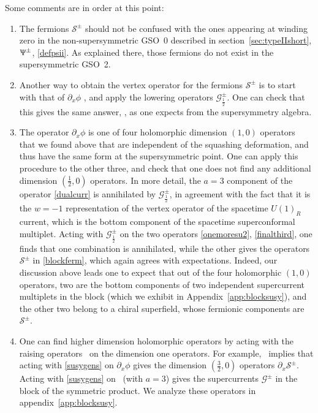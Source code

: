 \documentclass[12pt]{article}
\def\PsiST{\Uppsi}
\def\half{\frac12}
\def\coeff#1#2{{\textstyle \frac{#1}{#2}}}
\def\hf{\coeff12}
\numberwithin{equation}{section}
\def\cG{\mathcal {G}} \def\cH{\mathcal {H}} \def\cI{\mathcal {I}}
\def\cS{\mathcal {S}} \def\cT{\mathcal {T}} \def\cU{\mathcal {U}}
\def\coeff#1#2{{\textstyle{\frac{#1}{ #2}}}}
\def\half{\frac12}
\def\hf{{\textstyle\half}}
\begin{document}
Some comments are in order at this point:
\begin{enumerate}[1)]
\item The fermions $\cS^\pm$ should not be confused with the ones appearing at winding zero in the non-supersymmetric GSO~0 described in section~\ref{sec:typeIIshort}, $\PsiST^\pm$, \eqref{defpsii}. As explained there, those fermions do not exist in the supersymmetric GSO~2. 
\item Another way to obtain the vertex operator for the fermions $\cS^\pm$ is to start with that of $\partial_x\phi$ \dualbbzero, and apply the lowering operators $\cG^\pm_{\frac{1}{2}}$. One can check that this gives the same answer, \blockferm, as one expects from the supersymmetry algebra.
\item The operator $\partial_x\phi$ is one of four holomorphic dimension $(1,0)$ operators that we found above that are independent of the squashing deformation, and thus have the same form at the supersymmetric point. One can apply this procedure to the other three, and check that one does not find any additional dimension $(\hf,0)$ operators. In more detail, the $a=3$ component of the operator \eqref{dualcurr} is annihilated by $\cG^\pm_{\frac{1}{2}}$, in agreement with the fact that it is the $w=-1$ representation of the vertex operator of the spacetime $U(1)_R$ current, which is the bottom component of the spacetime superconformal multiplet. Acting with $\cG^\pm_{\frac{1}{2}}$ on the two operators \eqref{onemoresu2}, \eqref{finalthird}, one finds that one combination is annihilated, while the other gives the operators $\cS^\pm$ in \eqref{blockferm}, which again agrees with expectations. Indeed, our discussion above leads one to expect that out of the four holomorphic $(1,0)$ operators, two are the bottom components of two independent supercurrent multiplets in the block (which we exhibit in Appendix~\ref{app:blocksusy}), and the other two belong to a chiral superfield, whose fermionic components are $\cS^\pm$. 
%
\item One can find higher dimension holomorphic operators by acting with the raising operators \susygens\ on the dimension one operators. For example, \sppmm\ implies that acting with \eqref{susygens} on $\partial_x\phi$ gives the dimension $(\frac32,0)$ operators $\partial_x\cS^\pm$. Acting with \eqref{susygens} on \dualcurr\ (with $a=3$) gives the supercurrents $\cG^\pm$ in the block of the symmetric product.  We analyze these operators in appendix~\ref{app:blocksusy}.
\end{enumerate}
\end{document}
